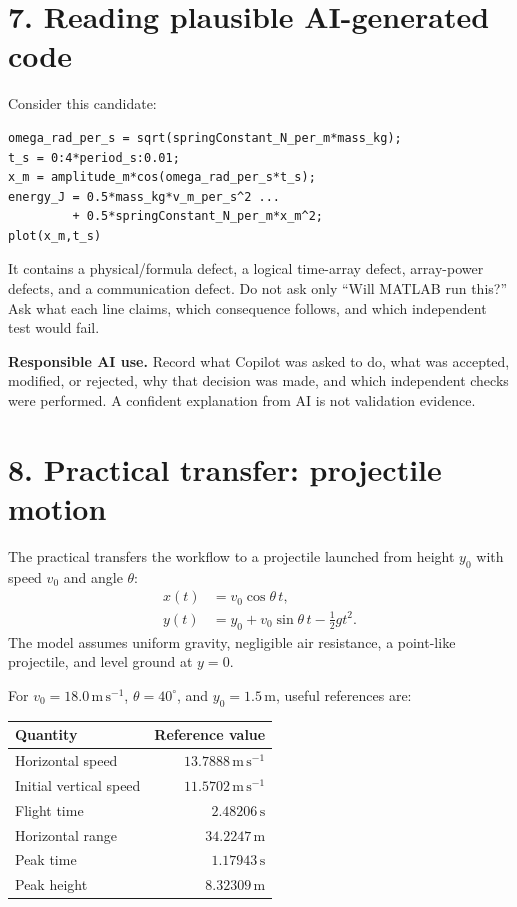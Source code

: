 \documentclass[11pt,a4paper]{article}
\begin{document}
\section*{7. Reading plausible AI-generated code}
Consider this candidate:
\begin{lstlisting}[style=matlabstyle]
omega_rad_per_s = sqrt(springConstant_N_per_m*mass_kg);
t_s = 0:4*period_s:0.01;
x_m = amplitude_m*cos(omega_rad_per_s*t_s);
energy_J = 0.5*mass_kg*v_m_per_s^2 ...
         + 0.5*springConstant_N_per_m*x_m^2;
plot(x_m,t_s)
\end{lstlisting}

It contains a physical/formula defect, a logical time-array defect, array-power defects, and a communication defect. Do not ask only ``Will MATLAB run this?'' Ask what each line claims, which consequence follows, and which independent test would fail.

\begin{aibox}
\textbf{Responsible AI use.} Record what Copilot was asked to do, what was accepted, modified, or rejected, why that decision was made, and which independent checks were performed. A confident explanation from AI is not validation evidence.
\end{aibox}

\section*{8. Practical transfer: projectile motion}
The practical transfers the workflow to a projectile launched from height $y_0$ with speed $v_0$ and angle $\theta$:
\begin{align}
 x(t)&=v_0\cos\theta\,t,\\
 y(t)&=y_0+v_0\sin\theta\,t-\frac12gt^2.
\end{align}
The model assumes uniform gravity, negligible air resistance, a point-like projectile, and level ground at $y=0$.

For $v_0=18.0\,\mathrm{m\,s^{-1}}$, $\theta=40^\circ$, and $y_0=1.5\,\mathrm{m}$, useful references are:
\begin{center}
\small
\begin{tabular}{lr}
\toprule
\textbf{Quantity} & \textbf{Reference value}\\ \midrule
Horizontal speed & $13.7888\,\mathrm{m\,s^{-1}}$\\
Initial vertical speed & $11.5702\,\mathrm{m\,s^{-1}}$\\
Flight time & $2.48206\,\mathrm{s}$\\
Horizontal range & $34.2247\,\mathrm{m}$\\
Peak time & $1.17943\,\mathrm{s}$\\
Peak height & $8.32309\,\mathrm{m}$\\ \bottomrule
\end{tabular}
\end{center}
\end{document}
